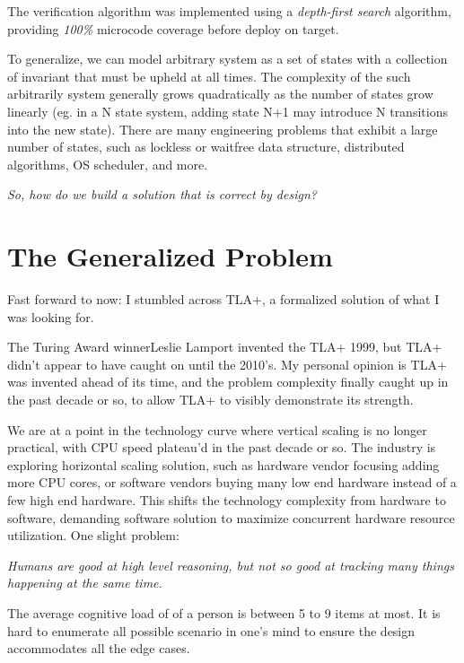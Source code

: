 The verification algorithm was implemented using a \textit{depth-first search}
algorithm, providing \textit{100\%} microcode coverage before deploy on
target.\newline

To generalize, we can model arbitrary system as a set of states with a
collection of invariant that must be upheld at all times. The complexity of the
such arbitrarily system generally grows quadratically as the number of states
grow linearly (eg. in a N state system, adding state N+1 may introduce N
transitions into the new state). There are many engineering problems that
exhibit a large number of states, such as lockless or waitfree data structure,
distributed algorithms, OS scheduler, and more.\newline

\textit{So, how do we build a solution that is correct by design?}

\section{The Generalized Problem}

Fast forward to now: I stumbled across TLA+, a formalized solution of what I was
looking for.\newline

The Turing Award winnerLeslie Lamport invented the TLA+ 1999, but TLA+ didn't
appear to have caught on until the 2010's. My personal opinion is TLA+ was
invented ahead of its time, and the problem complexity finally caught up in the
past decade or so, to allow TLA+ to visibly demonstrate its strength.\newline

We are at a point in the technology curve where vertical scaling is no longer
practical, with CPU speed plateau'd in the past decade or so. The industry is
exploring horizontal scaling solution, such as hardware vendor focusing adding
more CPU cores, or software vendors buying many low end hardware instead of a
few high end hardware. This shifts the technology complexity from hardware to
software, demanding software solution to maximize concurrent hardware resource
utilization. One slight problem:\newline

\textit{Humans are good at high level reasoning, but not so good at tracking
many things happening at the same time.}\newline

The average cognitive load of of a person is between 5 to 9 items at most. It is
hard to enumerate all possible scenario in one's mind to ensure the design
accommodates all the edge cases.\newline

